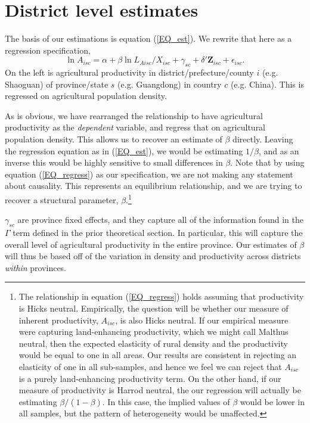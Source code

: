 \documentclass[11pt]{article}
\begin{document}
\section{District level estimates}
The basis of our estimations is equation (\ref{EQ_est}). We rewrite that here as a regression specification,
\begin{equation}
	\ln A_{isc} = \alpha + \beta \ln L_{Aisc}/X_{isc} + \gamma_{sc} + \delta' \mathbf{Z}_{isc} + \epsilon_{isc}. \label{EQ_regress}
\end{equation}
On the left is agricultural productivity in district/prefecture/county $i$ (e.g. Shaoguan) of province/state $s$ (e.g. Guangdong) in country $c$ (e.g. China). This is regressed on agricultural population density.

As is obvious, we have rearranged the relationship to have agricultural productivity as the \textit{dependent} variable, and regress that on agricultural population density. This allows us to recover an estimate of $\beta$ directly. Leaving the regression equation as in (\ref{EQ_est}), we would be estimating $1/\beta$, and as an inverse this would be highly sensitive to small differences in $\beta$. Note that by using equation (\ref{EQ_regress}) as our specification, we are not making any statement about causality. This represents an equilibrium relationship, and we are trying to recover a structural parameter, $\beta$.\footnote{The relationship in equation (\ref{EQ_regress}) holds assuming that productivity is Hicks neutral. Empirically, the question will be whether our measure of inherent productivity, $A_{isc}$, is also Hicks neutral. If our empirical measure were capturing land-enhancing productivity, which we might call Malthus neutral, then the expected elasticity of rural density and the productivity would be equal to one in all areas. Our results are consistent in rejecting an elasticity of one in all sub-samples, and hence we feel we can reject that $A_{isc}$ is a purely land-enhancing productivity term. On the other hand, if our measure of productivity is Harrod neutral, the our regression will actually be estimating $\beta/(1-\beta)$. In this case, the implied values of $\beta$ would be lower in all samples, but the pattern of heterogeneity would be unaffected.}

$\gamma_{sc}$ are province fixed effects, and they capture all of the information found in the $\Gamma$ term defined in the prior theoretical section. In particular, this will capture the overall level of agricultural productivity in the entire province. Our estimates of $\beta$ will thus be based off of the variation in density and productivity across districts \textit{within} provinces. 
\end{document}
